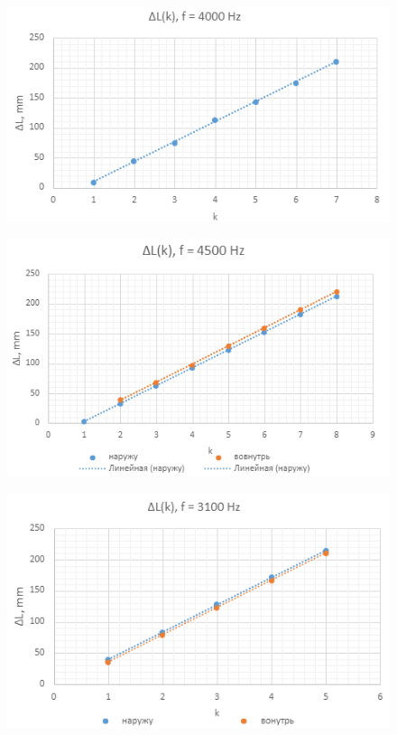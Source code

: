 \documentclass[12pt,a4paper]{article}
\begin{document}
\begin{figure}[h]
    \centering
    \begin{center}
    \end{center}
    \includegraphics[width=10 cm]{coplot3.PNG}
    \label{fig:coplot3}
\end{figure}
\begin{figure}[h]
    \centering
    \begin{center}
    \end{center}
    \includegraphics[width=10 cm]{coplot4.PNG}
    \label{fig:coplot4}
\end{figure}
\begin{figure}[h]
    \centering
    \begin{center}
    \end{center}
    \includegraphics[width=10 cm]{coplot5.PNG}
    \label{fig:coplot5}
\end{figure}
\newpage
\end{document}
